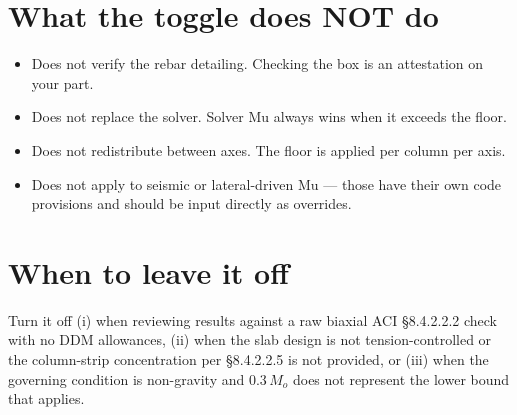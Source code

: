\documentclass[10pt]{article}
\begin{document}
\section*{What the toggle does NOT do}
\begin{itemize}
\item Does not verify the rebar detailing. Checking the box is an attestation on your part.
\item Does not replace the solver. Solver Mu always wins when it exceeds the floor.
\item Does not redistribute between axes. The floor is applied per column per axis.
\item Does not apply to seismic or lateral-driven Mu --- those have their own code provisions and should be input directly as overrides.
\end{itemize}

\section*{When to leave it off}
Turn it off (i) when reviewing results against a raw biaxial ACI \S 8.4.2.2.2 check with no DDM allowances, (ii) when the slab design is not tension-controlled or the column-strip concentration per \S 8.4.2.2.5 is not provided, or (iii) when the governing condition is non-gravity and $0.3\,M_o$ does not represent the lower bound that applies.
\end{document}
